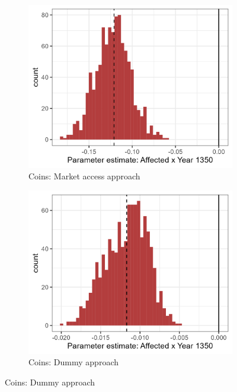 \begin{figure}
    \centering
    \caption{Distribution of parameter estimates in 1350  (full sample)}
    \begin{subfigure}[b]{0.45\textwidth}
        \centering
        \caption{Coins: Market access approach} \label{fig:distri_a_norm}
        \includegraphics[width=\textwidth]{Plots/Regression_plots/arch_MA_coins_boot_norm.png}
    \end{subfigure}
    \hfill
    \begin{subfigure}[b]{0.45\textwidth}
        \centering
        \caption{Coins: Dummy approach} \label{fig:distri_b_norm}
        \includegraphics[width=\textwidth]{Plots/Regression_plots/arch_dummy_coins_boot_norm.png}

\end{subfigure}
\end{figure}
